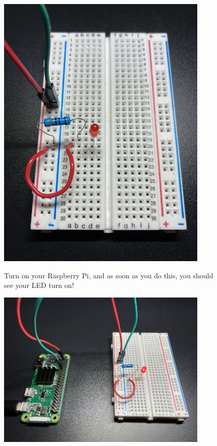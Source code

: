 \documentclass{article}\usepackage[]{graphicx}\usepackage[]{color}
\begin{document}
\begin{enumerate}
\begin{figure}
\includegraphics[width=0.90\textwidth]{bbresledwire}
\item Turn on your Raspberry Pi, and as soon as you do this, you should see your LED turn on!
\end{figure}

\begin{figure}
\includegraphics[width=0.90\textwidth]{ledon_bright}
\end{figure}


\end{enumerate}
\end{document}
